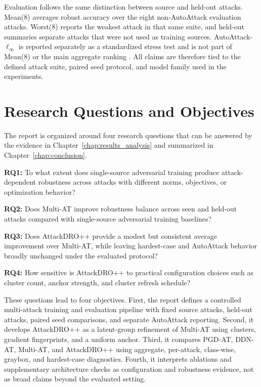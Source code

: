 Evaluation follows the same distinction between source and held-out attacks.
Mean(8) averages robust accuracy over the eight non-AutoAttack evaluation
attacks.  Worst(8) reports the weakest attack in that same suite, and held-out
summaries separate attacks that were not used as training sources.
AutoAttack-\(\ell_\infty\) is reported separately as a standardized stress test and is not
part of Mean(8) or the main aggregate ranking \cite{croce2020reliable}.  All
claims are therefore tied to the defined attack suite, paired seed protocol, and
model family used in the experiments.

\section{Research Questions and Objectives}

The report is organized around four research questions that can be answered by
the evidence in Chapter~\ref{chap:results_analysis} and summarized in
Chapter~\ref{chap:conclusion}.

\textbf{RQ1:} To what extent does single-source adversarial training produce
attack-dependent robustness across attacks with different norms, objectives, or
optimization behavior?

\textbf{RQ2:} Does Multi-AT improve robustness balance across seen and held-out
attacks compared with single-source adversarial training baselines?

\textbf{RQ3:} Does AttackDRO++ provide a modest but consistent average
improvement over Multi-AT, while leaving hardest-case and AutoAttack behavior
broadly unchanged under the evaluated protocol?

\textbf{RQ4:} How sensitive is AttackDRO++ to practical configuration choices
such as cluster count, anchor strength, and cluster refresh schedule?

These questions lead to four objectives.  First, the report defines a controlled
multi-attack training and evaluation pipeline with fixed source attacks,
held-out attacks, paired seed comparisons, and separate AutoAttack reporting.
Second, it develops AttackDRO++ as a latent-group refinement of Multi-AT using
clusters, gradient fingerprints, and a uniform anchor.  Third, it compares
PGD-AT, DDN-AT, Multi-AT, and AttackDRO++ using aggregate, per-attack,
class-wise, graybox, and hardest-case diagnostics.  Fourth, it interprets
ablations and supplementary architecture checks as configuration and robustness
evidence, not as broad claims beyond the evaluated setting.

